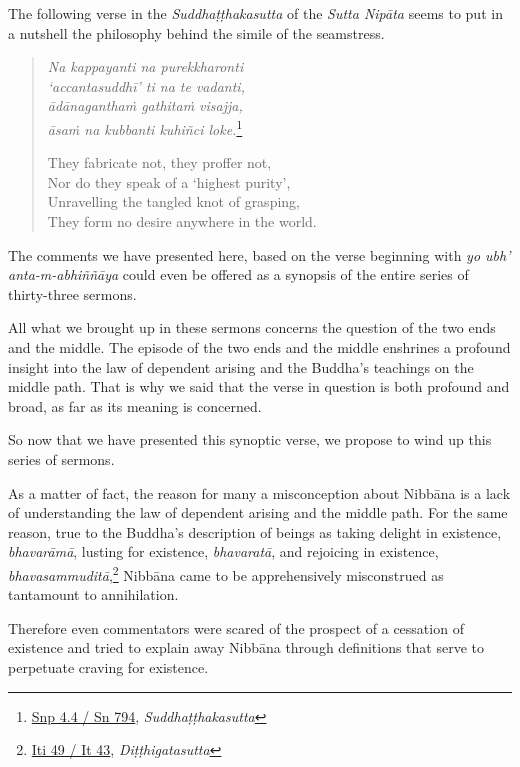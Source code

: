 The following verse in the \emph{Suddhaṭṭhakasutta} of the \emph{Sutta Nipāta} seems to put in a nutshell the philosophy behind the simile of the seamstress.

\begin{quote}
\emph{Na kappayanti na purekkharonti}\\
\emph{`accantasuddhī' ti na te vadanti,}\\
\emph{ādānaganthaṁ gathitaṁ visajja,}\\
\emph{āsaṁ na kubbanti kuhiñci loke.}\footnote{\href{https://suttacentral.net/snp4.4/pli/ms}{Snp 4.4 / Sn 794}, \emph{Suddhaṭṭhakasutta}}

They fabricate not, they proffer not,\\
Nor do they speak of a `highest purity',\\
Unravelling the tangled knot of grasping,\\
They form no desire anywhere in the world.
\end{quote}

The comments we have presented here, based on the verse beginning with \emph{yo ubh' anta-m-abhiññāya} could even be offered as a synopsis of the entire series of thirty-three sermons.

All what we brought up in these sermons concerns the question of the two ends and the middle. The episode of the two ends and the middle enshrines a profound insight into the law of dependent arising and the Buddha's teachings on the middle path. That is why we said that the verse in question is both profound and broad, as far as its meaning is concerned.

So now that we have presented this synoptic verse, we propose to wind up this series of sermons.

As a matter of fact, the reason for many a misconception about Nibbāna is a lack of understanding the law of dependent arising and the middle path. For the same reason, true to the Buddha's description of beings as taking delight in existence, \emph{bhavarāmā}, lusting for existence, \emph{bhavaratā}, and rejoicing in existence, \emph{bhavasammuditā},\footnote{\href{https://suttacentral.net/iti49/pli/ms}{Iti 49 / It 43}, \emph{Diṭṭhigatasutta}} Nibbāna came to be apprehensively misconstrued as tantamount to annihilation.

Therefore even commentators were scared of the prospect of a cessation of existence and tried to explain away Nibbāna through definitions that serve to perpetuate craving for existence.

